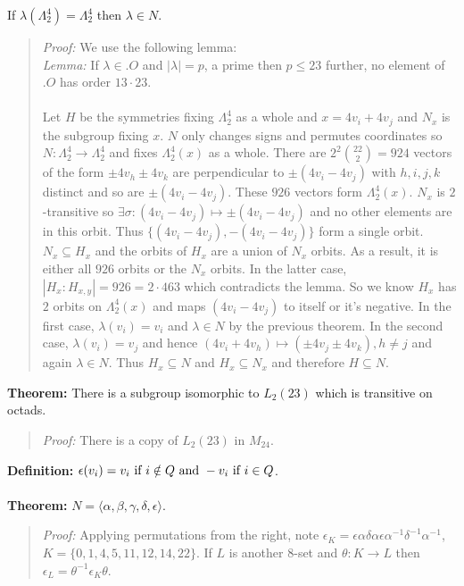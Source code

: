 If $\lambda(\Lambda_2^4)= \Lambda_2^4$ then
$\lambda \in N$.
\begin{quote}
\emph{Proof:}
We use the following lemma:
\\
\emph{Lemma:} If $\lambda \in .O$ and $|\lambda|= p$, a prime then $p \le 23$ further,
no element of $.O$ has order $13 \cdot 23$.
\\
\\
Let $H$ be the symmetries fixing $\Lambda_2^4$ as a whole and $x= 4v_i +4v_j$
and $N_x$ is the subgroup fixing $x$.  $N$ only changes signs and permutes
coordinates so $N: \Lambda_2^4 \rightarrow \Lambda_2^4$ and fixes
$\Lambda_2^4(x)$ as a whole.  There are $2^2 {22 \choose 2}= 924$ vectors
of the form $\pm 4 v_h \pm 4 v_k$ are perpendicular to 
$\pm(4 v_i - 4 v_j)$ with
$h, i, j,k$ distinct and so are
$\pm(4 v_i - 4 v_j)$.  These $926$ vectors form
$\Lambda_2^4(x)$.  $N_x$ is $2$-transitive so $\exists \sigma: 
(4 v_i - 4 v_j) \mapsto \pm (4 v_i - 4 v_j) $ and no other elements are in this orbit.
Thus $\{ (4 v_i - 4 v_j), -(4 v_i - 4 v_j) \} $ form a single orbit.
$N_x \subseteq H_x$ and the orbits of $H_x$ are a union of $N_x$ orbits.  As a result,
it is either all $926$ orbits or the $N_x$ orbits.  In the latter case,
$|H_x: H_{x,y}| = 926= 2 \cdot 463$ which contradicts the lemma.
So we know $H_x$ has $2$ orbits on $\Lambda_2^4(x)$ and maps 
$(4 v_i - 4 v_j)$ to itself or it's negative.  In the first case, $\lambda(v_i)= v_i$ and
$\lambda \in N$ by the
previous theorem.  In the second case, $\lambda( v_i)= v_j$ and hence
$ (4 v_i + 4 v_h)  \mapsto (\pm 4 v_j \pm 4 v_k) , h \ne j $ and again $\lambda \in N$.  Thus
$H_x \subseteq N$ and $H_x \subseteq N_x$ and therefore $H \subseteq N$.
\end{quote}
{\bf Theorem:}
There is a subgroup isomorphic to $L_2(23)$ which is
transitive on octads. 
\begin{quote}
\emph{Proof:} 
There is a copy of $L_2(23)$ in $M_{24}$.
\end{quote}
{\bf Definition:} $\epsilon(v_i) = 
v_i \textnormal{ if } i \notin Q \textnormal{ and } -v_i \textnormal{ if } i \in Q $.
\\
\\
{\bf Theorem:} $N= \langle \alpha, \beta, \gamma, \delta, \epsilon \rangle$.
\begin{quote}
\emph{Proof:} 
Applying permutations from the right, note $\epsilon_K= 
\epsilon \alpha  \delta \alpha  \epsilon \alpha^{-1} \delta^{-1} \alpha^{-1}$, 
$K= \{ 0,1,4,5,11,12,14,22 \}$.  If $L$ is another $8$-set and $\theta: K \rightarrow L$ then
$\epsilon_L = \theta^{-1} \epsilon_K \theta$.
\end{quote}
